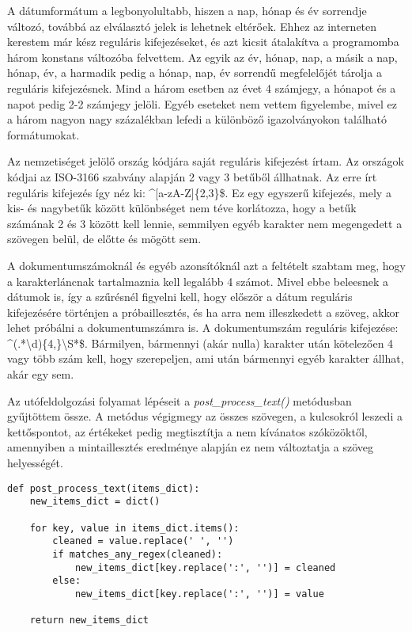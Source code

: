 \documentclass[12pt]{report}
\begin{document}
A dátumformátum a legbonyolultabb, hiszen a nap, hónap és év sorrendje változó, továbbá az elválasztó jelek is lehetnek eltérőek. Ehhez az interneten kerestem már kész reguláris kifejezéseket, és azt kicsit átalakítva a programomba három konstans változóba felvettem. Az egyik az év, hónap, nap, a másik a nap, hónap, év, a harmadik pedig a hónap, nap, év sorrendű megfelelőjét tárolja a reguláris kifejezésnek. Mind a három esetben az évet 4 számjegy, a hónapot és a napot pedig 2-2 számjegy jelöli. Egyéb eseteket nem vettem figyelembe, mivel ez a három nagyon nagy százalékban lefedi a különböző igazolványokon található formátumokat.

Az nemzetiséget jelölő ország kódjára saját reguláris kifejezést írtam. Az országok kódjai az ISO-3166 szabvány alapján 2 vagy 3 betűből állhatnak. Az erre írt reguláris kifejezés így néz ki: \textasciicircum[a-zA-Z]\{2,3\}\$. Ez egy egyszerű kifejezés, mely a kis- és nagybetűk között különbséget nem téve korlátozza, hogy a betűk számának 2 és 3 között kell lennie, semmilyen egyéb karakter nem megengedett a szövegen belül, de előtte és mögött sem.

A dokumentumszámoknál és egyéb azonsítóknál azt a feltételt szabtam meg, hogy a karakterláncnak tartalmaznia kell legalább 4 számot. Mivel ebbe beleesnek a dátumok is, így a szűrésnél figyelni kell, hogy először a dátum reguláris kifejezésére történjen a próbaillesztés, és ha arra nem illeszkedett a szöveg, akkor lehet próbálni a dokumentumszámra is. A dokumentumszám reguláris kifejezése: \textasciicircum(.*\textbackslash d)\{4,\}\textbackslash S*\$. Bármilyen, bármennyi (akár nulla) karakter után kötelezően 4 vagy több szám kell, hogy szerepeljen, ami után bármennyi egyéb karakter állhat, akár egy sem.

Az utófeldolgozási folyamat lépéseit a \emph{post\_process\_text()} metódusban gyűjtöttem össze. A metódus végigmegy az összes szövegen, a kulcsokról leszedi a kettőspontot, az értékeket pedig megtisztítja a nem kívánatos szóközöktől, amennyiben a mintaillesztés eredménye alapján ez nem változtatja a szöveg helyességét.

\begin{verbatim}
def post_process_text(items_dict):
    new_items_dict = dict()

    for key, value in items_dict.items():
        cleaned = value.replace(' ', '')
        if matches_any_regex(cleaned):
            new_items_dict[key.replace(':', '')] = cleaned
        else:
            new_items_dict[key.replace(':', '')] = value

    return new_items_dict
\end{verbatim}
\end{document}
